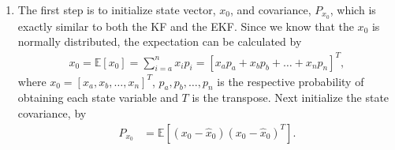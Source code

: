 \begin{enumerate}
    \item The first step is to initialize state vector, $x_0$, and covariance, $P_{x_0}$, which is exactly similar to both the KF and the EKF. Since we know that the $x_0$ is normally distributed, the expectation can be calculated by
    \begin{align*}
    	x_0 = \mathbb{E}[x_0]   = \sum^n_{i = a} x_i p_i = [x_a p_a + x_b p_b + \hdots + x_n p_n]^T,
    \end{align*}
   where $x_0= [x_a, x_b, \hdots, x_n]^T$, $p_a, p_b, \hdots, p_n$  is the respective probability of obtaining each state variable and $T$ is the transpose. Next initialize the state covariance, by
    \begin{align*}
        P_{x_{0}} &= \mathbb{E}[(x_{0}-\hat{x}_{0})(x_{0}-\hat{x}_{0})^{T}].
    \end{align*}
    

\end{enumerate}
